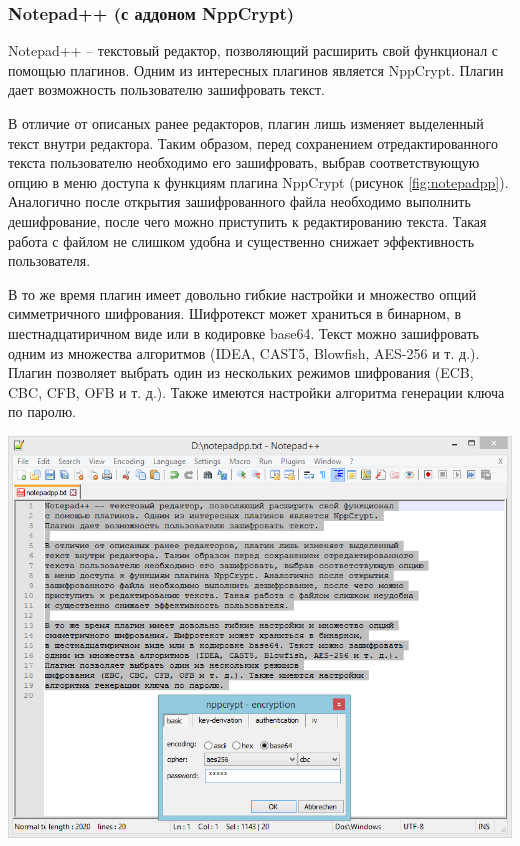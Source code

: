 \subsubsection{Notepad++ (с аддоном NppCrypt)}

Notepad++ -- текстовый редактор, позволяющий расширить свой функционал
с помощью плагинов. Одним из интересных плагинов является NppCrypt.
Плагин дает возможность пользователю зашифровать текст.

В отличие от описаных ранее редакторов, плагин лишь изменяет выделенный
текст внутри редактора. Таким образом, перед сохранением отредактированного
текста пользователю необходимо его зашифровать, выбрав соответствующую опцию
в меню доступа к функциям плагина NppCrypt (рисунок \ref{fig:notepadpp}).
Аналогично после открытия зашифрованного файла необходимо выполнить
дешифрование, после чего можно приступить к редактированию текста.
Такая работа с файлом не слишком удобна и существенно снижает
эффективность пользователя.

В то же время плагин имеет довольно гибкие настройки и множество опций
симметричного шифрования. Шифротекст может храниться в бинарном,
в шестнадцатиричном виде или в кодировке base64. Текст можно зашифровать
одним из множества алгоритмов (IDEA, CAST5, Blowfish, AES-256 и т. д.).
Плагин позволяет выбрать один из нескольких режимов
шифрования (ECB, CBC, CFB, OFB и т. д.). Также имеются настройки
алгоритма генерации ключа по паролю.

\noindent
\begin{minipage}{\textwidth}
  \vspace{3.5mm}
  \centering
  \includegraphics[scale=0.6]{./pics/notepadpp-main.png}
  \label{fig:notepadpp}
  \vspace{3.5mm}
\end{minipage}

